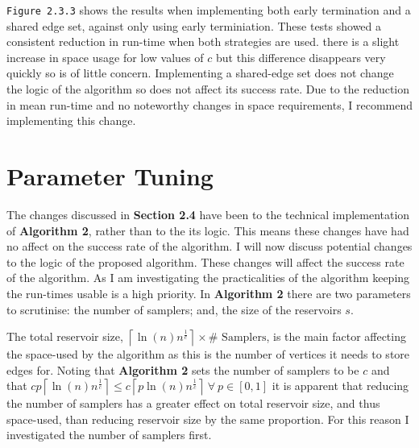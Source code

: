 \documentclass[11pt,twoside,a4paper]{report}
\begin{document}
\par \texttt{Figure 2.3.3} shows the results when implementing both early termination and a shared edge set, against only using early terminiation. These tests showed a consistent reduction in run-time when both strategies are used. there is a slight increase in space usage for low values of $c$ but this difference disappears very quickly so is of little concern. Implementing a shared-edge set does not change the logic of the algorithm so does not affect its success rate. Due to the reduction in mean run-time and no noteworthy changes in space requirements, I recommend implementing this change.

\section{Parameter Tuning}


\par The changes discussed in \textbf{Section 2.4} have been to the technical implementation of \textbf{Algorithm 2}, rather than to the its logic. This means these changes have had no affect on the success rate of the algorithm. I will now discuss potential changes to the logic of the proposed algorithm. These changes will affect the success rate of the algorithm. As I am investigating the practicalities of the algorithm keeping the run-times usable is a high priority. In \textbf{Algorithm 2} there are two parameters to scrutinise: the number of samplers; and, the size of the reservoirs $s$.

\par The total reservoir size, $\left\lceil\ln(n)n^{\frac1c}\right\rceil\times\text{\#\ Samplers}$, is the main factor affecting the space-used by the algorithm as this is the number of vertices it needs to store edges for. Noting that \textbf{Algorithm 2} sets the number of samplers to be $c$ and that $cp\left\lceil\ln(n)n^{\frac1c}\right\rceil\leq c\left\lceil p\ln(n)n^{\frac1c}\right\rceil\ \forall\ p\in[0,1]$ it is apparent that reducing the number of samplers has a greater effect on total reservoir size, and thus space-used, than reducing reservoir size by the same proportion. For this reason I investigated the number of samplers first.
\end{document}
